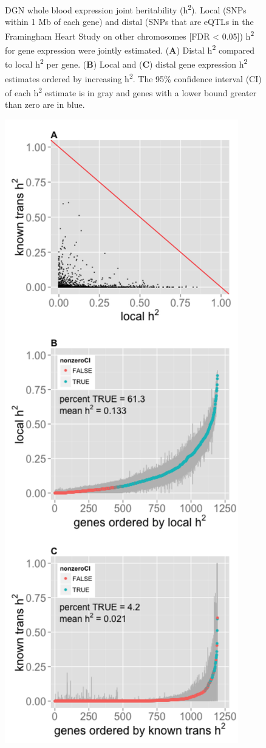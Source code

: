 \documentclass[]{article}
\begin{document}
\begin{figure}[htbp]
\caption{DGN whole blood expression joint heritability
(h\textsuperscript{2}). Local (SNPs within 1 Mb of each gene) and distal
(SNPs that are eQTLs in the Framingham Heart Study on other chromosomes
{[}FDR \textless{} 0.05{]}) h\textsuperscript{2} for gene expression
were jointly estimated. (\textbf{A}) Distal h\textsuperscript{2}
compared to local h\textsuperscript{2} per gene. (\textbf{B}) Local and
(\textbf{C}) distal gene expression h\textsuperscript{2} estimates
ordered by increasing h\textsuperscript{2}. The 95\% confidence interval
(CI) of each h\textsuperscript{2} estimate is in gray and genes with a
lower bound greater than zero are in blue.}
\end{figure}

\begin{figure}[htbp]
\centering
\includegraphics{GenArch_manuscript_files/figure-latex/transH2-1.pdf}

\end{figure}
\end{document}
